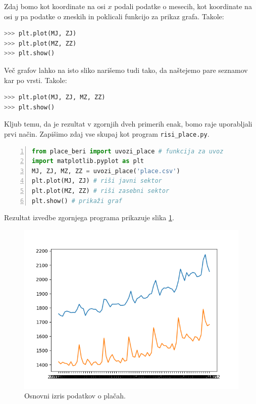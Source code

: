 Zdaj bomo kot koordinate na osi $x$ podali podatke o mesecih, kot koordinate na osi $y$ pa podatke o zneskih in poklicali funkcijo za prikaz grafa. Takole:
\begin{lstlisting}[language=Python, showstringspaces=false]
>>> plt.plot(MJ, ZJ)
>>> plt.plot(MZ, ZZ)
>>> plt.show()
\end{lstlisting}
Več grafov lahko na isto sliko narišemo tudi tako, da naštejemo pare seznamov kar po vrsti. Takole: 
\begin{lstlisting}[language=Python, showstringspaces=false]
>>> plt.plot(MJ, ZJ, MZ, ZZ)
>>> plt.show()
\end{lstlisting}
Kljub temu, da je rezultat v zgornjih dveh primerih enak, bomo raje uporabljali prvi način.
Zapišimo zdaj vse skupaj kot program \texttt{risi\_place.py}.
\begin{lstlisting}[language=Python, showstringspaces=false,numbers=left]
from place_beri import uvozi_place # funkcija za uvoz
import matplotlib.pyplot as plt 
MJ, ZJ, MZ, ZZ = uvozi_place('place.csv')
plt.plot(MJ, ZJ) # riši javni sektor
plt.plot(MZ, ZZ) # riši zasebni sektor
plt.show() # prikaži graf
\end{lstlisting}
Rezultat izvedbe zgornjega programa prikazuje slika \ref{img:plt3}.
\begin{figure}
    \includegraphics[width=\linewidth]{img/plt3.png}
    \caption{Osnovni izris podatkov o plačah.}
    \label{img:plt3}
\end{figure}

